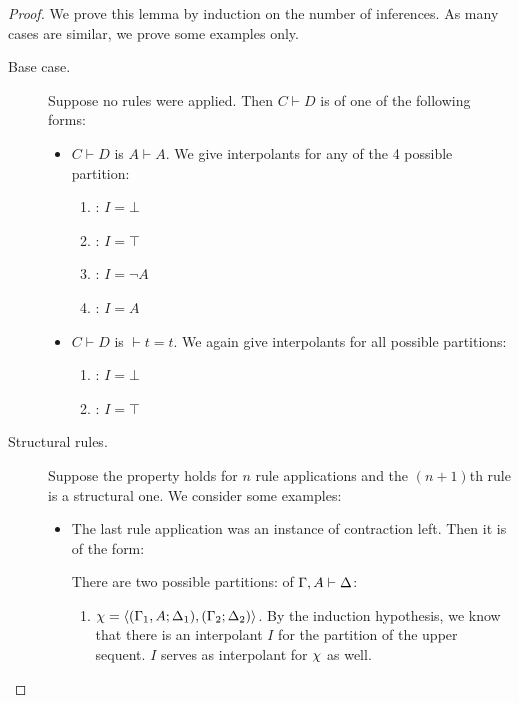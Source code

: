 \begin{proof}
	We prove this lemma by induction on the number of inferences.
	As many cases are similar, we prove some examples only.

	\begin{description}
		\item[\normalfont Base case.]
			Suppose no rules were applied.
			Then $C \vdash D$ is of one of the following forms:
			\begin{itemize}
				\item $C \vdash D$ is $A \vdash A$. We give interpolants for any of the 4 possible partition:
					\begin{enumerate}
						\item {}: $I=\bot$
						\item {}: $I=\top$
						\item {}: $I=\lnot A$
						\item {}: $I=A$
					\end{enumerate}
				\item $C \vdash D$ is $\vdash t=t$. We again give interpolants for all possible partitions:
					\begin{enumerate}
						\item {}: $I=\bot$
						\item {}: $I=\top$
					\end{enumerate}
			\end{itemize}

		\item[\normalfont Structural rules.]
			Suppose the property holds for $n$ rule applications and the $(n+1)$th rule is a structural one.
			We consider some examples:

			\begin{itemize}
				\item The last rule application was an instance of contraction left. Then it is of the form:
					\begin{prooftree}
					\end{prooftree}

					There are two possible partitions: of $\Gamma, A \vdash \Delta$:
					\begin{enumerate}
							\item $\chi =  \langle (\Gamma_1, A; \Delta_1), (\Gamma_2; \Delta_2)\rangle $.
								By the induction hypothesis, we know that there is an interpolant $I$ for the partition  of the upper sequent.
								$I$ serves as interpolant for $\chi$ as well.


\end{enumerate}
\end{itemize}
\end{description}
\end{proof}
